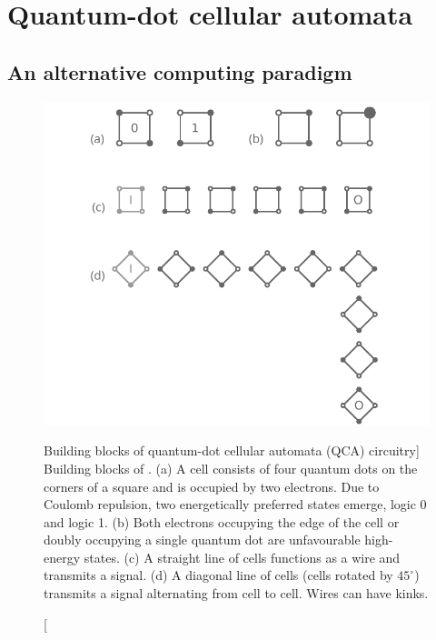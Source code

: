 \chapter{Quantum-dot cellular automata}
\label{ch:QCA_intro}
\graphicspath{{../gfx/chapter01/}}


\section{An alternative computing paradigm}
\label{sec:an_alternative_computing_paradigm}

\begin{figure}
  \center
  \includegraphics{intro_qca}
  \caption
[Building blocks of quantum-dot cellular automata (QCA) circuitry]
{
Building blocks of . (a) A  cell consists of four quantum
dots on the corners of a square and is occupied by two electrons. Due to Coulomb
repulsion, two energetically preferred states emerge, logic 0 and logic 1. (b)
Both electrons occupying the edge of the cell or doubly occupying a single
quantum dot are unfavourable high-energy states. (c) A straight line of cells
functions as a wire and transmits a signal. (d) A diagonal line of cells (cells
rotated by $45^{\circ}$) transmits a signal alternating from cell to cell. Wires
can have kinks.
}
  \label{fig:intro_qca}
\end{figure}
%
